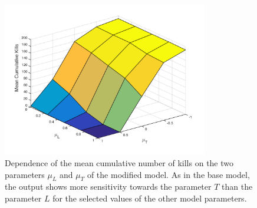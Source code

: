 \documentclass[11pt]{article}
\begin{document}
\begin{figure}[!htbp]
	\centering
		\includegraphics[width=0.80\textwidth]{../../code/modified_model/L_T_mean_dep_mean.png}
	\caption{Dependence of the mean cumulative number of kills on the two parameters $\mu_L$ and $\mu_T$ of the modified model. As in the base model, the output shows more sensitivity towards the parameter $T$ than the parameter $L$ for the selected values of the other model parameters.}
	\label{fig:L_T_dep_mod}
\end{figure}
\end{document}
